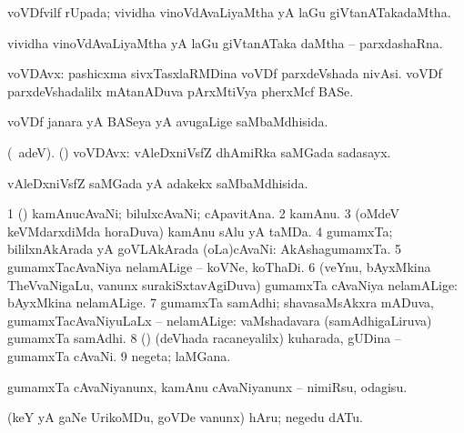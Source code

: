 \bentry
{} 
\gl{\gu}
\expl{}
\bmng
voVDfvilf rUpada; vividha vinoVdAvaLiyaMtha yA laGu giVtanATakadaMtha. 
\emng
\eentry

\bentry
{} 
\gl{\nA}
\expl{}
\bmng
 vividha vinoVdAvaLiyaMtha yA laGu giVtanATaka daMtha -- parxdashaRna. 
\emng
\eentry

\bentry
{}
\gl{\nA}
\bmng
 voVDAvx: 
\banum
{} pashicxma sivxTasxlaRMDina voVDf parxdeVshada nivAsi. 
 voVDf parxdeVshadalilx mAtanADuva pArxMtiVya pherxMcf BASe. 
\eanum
\emng
\eentry

\bentry
{} 
\gl{\gu}
\expl{}
\bmng
 voVDf janara yA BASeya yA avugaLige saMbaMdhisida. 
\emng
\eentry

\bentry
{} 
\gl{\nA}
\bmng
(\bava\ adeV). (\ca) voVDAvx: vAleDxniVsfZ dhAmiRka saMGada sadasayx. 
\emng
\eentry

\bentry
{} 
\gl{\gu}
\expl{}
\bmng
 vAleDxniVsfZ saMGada yA adakekx saMbaMdhisida. 
\emng
\eentry

\bentry
{} 
\gl{\nA}
\bmng
\bnum
\num{1} (\vAshi) kamAnucAvaNi; bilulxcAvaNi; cApavitAna.  
\num{2} kamAnu. 
\num{3} (oMdeV keVMdarxdiMda horaDuva) kamAnu sAlu yA taMDa. 
\num{4} gumamxTa; bililxnAkArada yA goVLAkArada (oLa)cAvaNi:  AkAshagumamxTa. 
\num{5} gumamxTacAvaNiya nelamALige -- koVNe, koThaDi. 
\num{6} (veYnu, bAyxMkina TheVvaNigaLu, \mo vanunx surakiSxtavAgiDuva) gumamxTa cAvaNiya nelamALige:  bAyxMkina nelamALige. 
\num{7} gumamxTa samAdhi; shavasaMsAkxra mADuva, gumamxTacAvaNiyuLaLx -- nelamALige:  vaMshadavara (samAdhigaLiruva) gumamxTa samAdhi. 
\num{8} (\aMrashA) (deVhada racaneyalilx) kuharada, gUDina -- gumamxTa cAvaNi. 
\num{9} negeta; laMGana. 
\enum
\emng
\eentry

\bentry
{} 
\gl{\sakirx}
\expl{}
\bmng
 gumamxTa cAvaNiyanunx, kamAnu cAvaNiyanunx -- nimiRsu, odagisu. 
\emng
\eentry

\bentry
{} 
\gl{\sakirx}
\expl{}
\bmng
 (keY yA gaNe UrikoMDu, goVDe \mo vanunx) hAru; negedu dATu. 
\emng

